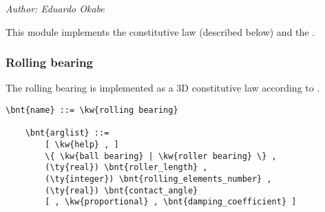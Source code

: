 % 
% 
% 
% 
% 
% 
% 
% 
% 
\emph{Author: Eduardo Okabe}

\noindent
This module implements the  constitutive law (described below) and the .

\subsubsection{Rolling bearing}
\label{sec:MODULES:CL:ROLLING-BEARING}

The rolling bearing is implemented as a 3D constitutive law according to \cite{HAMBRIC-2013-JVA}.
\begin{Verbatim}[commandchars=\\\{\}]
    \bnt{name} ::= \kw{rolling bearing}

    \bnt{arglist} ::=
        [ \kw{help} , ]
        \{ \kw{ball bearing} | \kw{roller bearing} \} ,
        (\ty{real}) \bnt{roller_length} ,
        (\ty{integer}) \bnt{rolling_elements_number} ,
        (\ty{real}) \bnt{contact_angle}
        [ , \kw{proportional} , \bnt{damping_coefficient} ]
\end{Verbatim}


